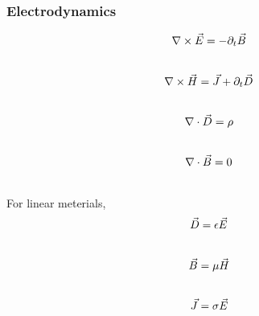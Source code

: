 \documentclass[letterpaper,10pt,english]{sphinxmanual}
\begin{document}
\subsubsection{Electrodynamics}
\label{Basic:electrodynamics}\begin{gather}
\begin{split}\nabla\times\vec E=-\partial_t \vec B\end{split}\notag\\\begin{split}\end{split}\notag
\end{gather}\begin{gather}
\begin{split}\nabla\times\vec H=\vec J+\partial_t \vec D\end{split}\notag\\\begin{split}\end{split}\notag
\end{gather}\begin{gather}
\begin{split}\nabla\cdot \vec D=\rho\end{split}\notag\\\begin{split}\end{split}\notag
\end{gather}\begin{gather}
\begin{split}\nabla\cdot \vec B=0\end{split}\notag\\\begin{split}\end{split}\notag
\end{gather}
For linear meterials,
\begin{gather}
\begin{split}\vec D=\epsilon \vec E\end{split}\notag\\\begin{split}\end{split}\notag
\end{gather}\begin{gather}
\begin{split}\vec B=\mu \vec H\end{split}\notag\\\begin{split}\end{split}\notag
\end{gather}\begin{gather}
\begin{split}\vec J= \sigma \vec E\end{split}\notag\\\begin{split}\end{split}\notag
\end{gather}
\end{document}
